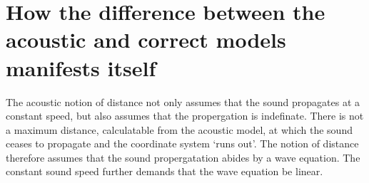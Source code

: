 











\section{How the difference between the acoustic and correct models manifests itself}

The acoustic notion of distance not only assumes
that the sound propagates at a constant speed,
but also assumes that the propergation is indefinate.
There is not a maximum distance,
calculatable from the acoustic model,
at which the sound ceases to propagate and the coordinate system `runs out'.
The notion of distance therefore assumes that the sound propergatation abides by a wave equation.
The constant sound speed further demands that the wave equation be linear.


